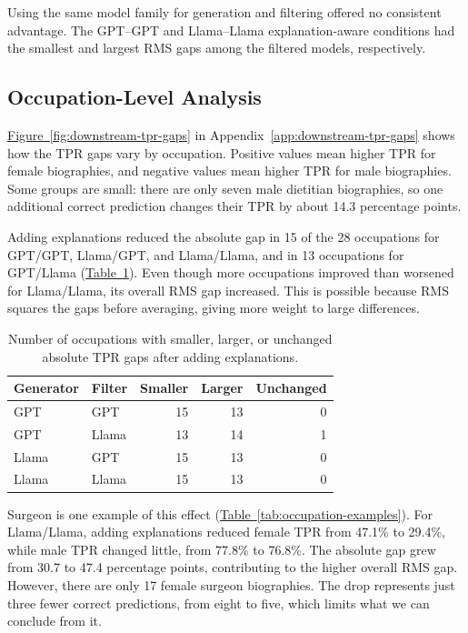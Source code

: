 \documentclass[sigconf]{acmart}
\begin{document}
Using the same model family for generation and filtering offered no consistent advantage. The GPT--GPT and Llama--Llama explanation-aware conditions had the smallest and largest RMS gaps among the filtered models, respectively.

\subsection{Occupation-Level Analysis}
\label{sec:occupation-results}

\hyperref[fig:downstream-tpr-gaps]{Figure~\ref*{fig:downstream-tpr-gaps}} in Appendix~\ref{app:downstream-tpr-gaps} shows how the TPR gaps vary by occupation. Positive values mean higher TPR for female biographies, and negative values mean higher TPR for male biographies. Some groups are small: there are only seven male dietitian biographies, so one additional correct prediction changes their TPR by about 14.3 percentage points.

Adding explanations reduced the absolute gap in 15 of the 28 occupations for GPT/GPT, Llama/GPT, and Llama/Llama, and in 13 occupations for GPT/Llama (\hyperref[tab:occupation-changes]{Table~\ref*{tab:occupation-changes}}). Even though more occupations improved than worsened for Llama/Llama, its overall RMS gap increased. This is possible because RMS squares the gaps before averaging, giving more weight to large differences.

\begin{table}[H]
    \centering
    \caption{Number of occupations with smaller, larger, or unchanged absolute TPR gaps after adding explanations.}
    \label{tab:occupation-changes}
    \small
    \begin{tabular}{llrrr}
        \toprule
        Generator & Filter & Smaller & Larger & Unchanged \\
        \midrule
        GPT & GPT & 15 & 13 & 0 \\
        GPT & Llama & 13 & 14 & 1 \\
        Llama & GPT & 15 & 13 & 0 \\
        Llama & Llama & 15 & 13 & 0 \\
        \bottomrule
    \end{tabular}
\end{table}

Surgeon is one example of this effect (\hyperref[tab:occupation-examples]{Table~\ref*{tab:occupation-examples}}). For Llama/Llama, adding explanations reduced female TPR from 47.1\% to 29.4\%, while male TPR changed little, from 77.8\% to 76.8\%. The absolute gap grew from 30.7 to 47.4 percentage points, contributing to the higher overall RMS gap. However, there are only 17 female surgeon biographies. The drop represents just three fewer correct predictions, from eight to five, which limits what we can conclude from it.
\end{document}
